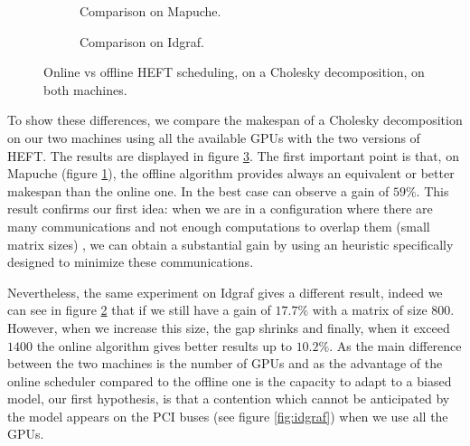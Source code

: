 \documentclass[10pt, conference, compsocconf,pdftex,dvipsnames]{IEEEtran}
\begin{document}
\begin{figure}[h!]
    \centering
    \begin{subfigure}{0.5\textwidth}
        \scalebox{0.65}{
            
        }
        \caption{Comparison on Mapuche.}
        \label{fig:OnOffMapuche}
    \end{subfigure}
    \begin{subfigure}{0.5\textwidth}
        \scalebox{0.65}{
            
        }
        \caption{Comparison on Idgraf.}
        \label{fig:OnOffIdgraf}
    \end{subfigure}
    \caption{Online vs offline HEFT scheduling, on a Cholesky decomposition, on both
    machines.}
    \label{fig:OnOff}
\end{figure}

To show these differences, we compare the makespan of a Cholesky decomposition on
our two machines using all the available GPUs  with the two versions of HEFT.
The results are displayed in figure \ref{fig:OnOff}. The first important point
is that, on Mapuche (figure \ref{fig:OnOffMapuche}), the offline algorithm
provides always an equivalent or better makespan than the online one. In the
best case can observe a gain of $59\%$. This result confirms our first idea:
when we are in a configuration where there are many communications and not
enough computations to overlap them (small matrix sizes) , we can obtain a
substantial gain by using an heuristic specifically designed to minimize these
communications.

Nevertheless, the same experiment on Idgraf gives a different result, indeed
we can see in figure \ref{fig:OnOffIdgraf} that if we still have a gain of
$17.7\%$ with a matrix of size $800$. However, when we increase this size, the
gap shrinks and finally, when it exceed $1400$ the online algorithm gives
better results up to $10.2\%$. As the main difference between the two machines
is the number of GPUs and as the advantage of the online scheduler compared to
the offline one is the capacity to adapt to a biased model, our first
hypothesis, is that a contention which cannot be anticipated by the model
appears on the PCI buses (see figure \ref{fig:idgraf}) when we use all the
GPUs. 
\end{document}
